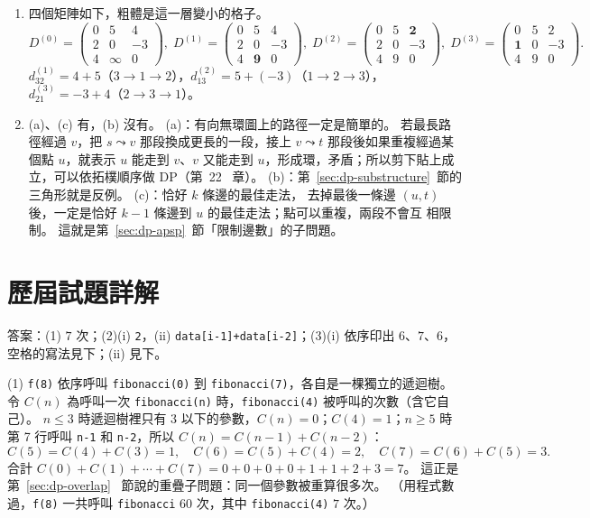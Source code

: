 \begin{enumerate}
\item 四個矩陣如下，粗體是這一層變小的格子。
{\small
\[
D^{(0)} = \begin{pmatrix} 0 & 5 & 4 \\ 2 & 0 & -3 \\ 4 & \infty & 0 \end{pmatrix},\;
D^{(1)} = \begin{pmatrix} 0 & 5 & 4 \\ 2 & 0 & -3 \\ 4 & \mathbf{9} & 0 \end{pmatrix},\;
D^{(2)} = \begin{pmatrix} 0 & 5 & \mathbf{2} \\ 2 & 0 & -3 \\ 4 & 9 & 0 \end{pmatrix},\;
D^{(3)} = \begin{pmatrix} 0 & 5 & 2 \\ \mathbf{1} & 0 & -3 \\ 4 & 9 & 0 \end{pmatrix}.
\]
}
$d_{32}^{(1)} = 4 + 5$（$3 \to 1 \to 2$），$d_{13}^{(2)} = 5 + (-3)$（$1 \to 2 \to 3$），
$d_{21}^{(3)} = -3 + 4$（$2 \to 3 \to 1$）。

\item (a)、(c) 有，(b) 沒有。 (a)：有向無環圖上的路徑一定是簡單的。 若最長路徑經過 $v$，把
$s \leadsto v$ 那段換成更長的一段，接上 $v \leadsto t$ 那段後如果重複經過某個點 $u$，就表示
$u$ 能走到 $v$、$v$ 又能走到 $u$，形成環，矛盾；所以剪下貼上成立，可以依拓樸順序做 DP（第~22~
章）。 (b)：第~\ref{sec:dp-substructure}~節的三角形就是反例。 (c)：恰好 $k$ 條邊的最佳走法，
去掉最後一條邊 $(u, t)$ 後，一定是恰好 $k - 1$ 條邊到 $u$ 的最佳走法；點可以重複，兩段不會互
相限制。 這就是第~\ref{sec:dp-apsp}~節「限制邊數」的子問題。
\end{enumerate}

\section*{歷屆試題詳解}

答案：(1) $7$ 次；(2)(i) \texttt{2}，(ii) \texttt{data[i-1]+data[i-2]}；(3)(i) 依序印出 $6$、$7$、$6$，空格的寫法見下；(ii) 見下。

(1) \texttt{f(8)} 依序呼叫 \texttt{fibonacci(0)} 到 \texttt{fibonacci(7)}，各自是一棵獨立的遞迴樹。
令 $C(n)$ 為呼叫一次 \texttt{fibonacci(n)} 時，\texttt{fibonacci(4)} 被呼叫的次數（含它自己）。
$n \le 3$ 時遞迴樹裡只有 $3$ 以下的參數，$C(n) = 0$；$C(4) = 1$；$n \ge 5$ 時第 7 行呼叫
\texttt{n-1} 和 \texttt{n-2}，所以 $C(n) = C(n - 1) + C(n - 2)$：
\[
C(5) = C(4) + C(3) = 1, \quad C(6) = C(5) + C(4) = 2, \quad C(7) = C(6) + C(5) = 3 .
\]
合計 $C(0) + C(1) + \cdots + C(7) = 0 + 0 + 0 + 0 + 1 + 1 + 2 + 3 = 7$。 這正是第~\ref{sec:dp-overlap}~
節說的重疊子問題：同一個參數被重算很多次。 （用程式數過，\texttt{f(8)} 一共呼叫
\texttt{fibonacci} $60$ 次，其中 \texttt{fibonacci(4)} $7$ 次。）

